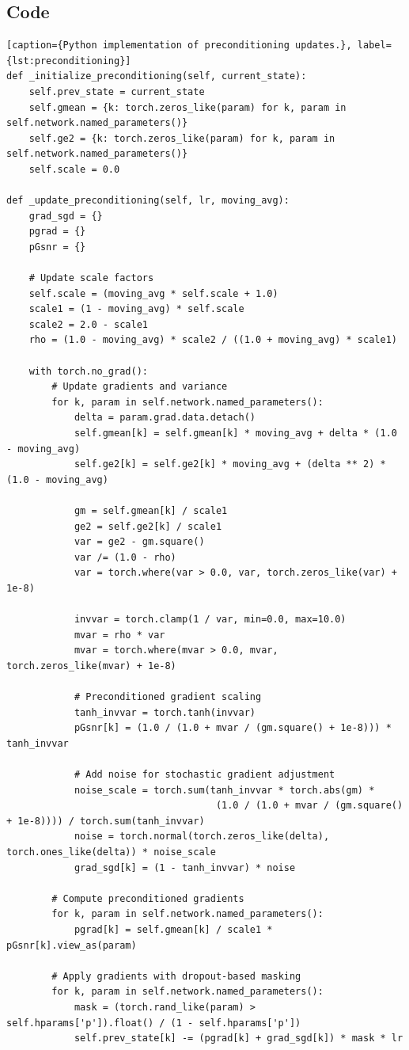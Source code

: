 \documentclass{article}
\theoremstyle{plain}
\theoremstyle{definition}
\theoremstyle{remark}
\begin{document}
\subsection{Code}
\begin{lstlisting}
[caption={Python implementation of preconditioning updates.}, label={lst:preconditioning}]
def _initialize_preconditioning(self, current_state):
    self.prev_state = current_state
    self.gmean = {k: torch.zeros_like(param) for k, param in self.network.named_parameters()}
    self.ge2 = {k: torch.zeros_like(param) for k, param in self.network.named_parameters()}
    self.scale = 0.0

def _update_preconditioning(self, lr, moving_avg):
    grad_sgd = {}
    pgrad = {}
    pGsnr = {}

    # Update scale factors
    self.scale = (moving_avg * self.scale + 1.0)
    scale1 = (1 - moving_avg) * self.scale
    scale2 = 2.0 - scale1
    rho = (1.0 - moving_avg) * scale2 / ((1.0 + moving_avg) * scale1)

    with torch.no_grad():
        # Update gradients and variance
        for k, param in self.network.named_parameters():
            delta = param.grad.data.detach()
            self.gmean[k] = self.gmean[k] * moving_avg + delta * (1.0 - moving_avg)
            self.ge2[k] = self.ge2[k] * moving_avg + (delta ** 2) * (1.0 - moving_avg)

            gm = self.gmean[k] / scale1
            ge2 = self.ge2[k] / scale1
            var = ge2 - gm.square()
            var /= (1.0 - rho)
            var = torch.where(var > 0.0, var, torch.zeros_like(var) + 1e-8)

            invvar = torch.clamp(1 / var, min=0.0, max=10.0)
            mvar = rho * var
            mvar = torch.where(mvar > 0.0, mvar, torch.zeros_like(mvar) + 1e-8)

            # Preconditioned gradient scaling
            tanh_invvar = torch.tanh(invvar)
            pGsnr[k] = (1.0 / (1.0 + mvar / (gm.square() + 1e-8))) * tanh_invvar

            # Add noise for stochastic gradient adjustment
            noise_scale = torch.sum(tanh_invvar * torch.abs(gm) * 
                                     (1.0 / (1.0 + mvar / (gm.square() + 1e-8)))) / torch.sum(tanh_invvar)
            noise = torch.normal(torch.zeros_like(delta), torch.ones_like(delta)) * noise_scale
            grad_sgd[k] = (1 - tanh_invvar) * noise

        # Compute preconditioned gradients
        for k, param in self.network.named_parameters():
            pgrad[k] = self.gmean[k] / scale1 * pGsnr[k].view_as(param)

        # Apply gradients with dropout-based masking
        for k, param in self.network.named_parameters():
            mask = (torch.rand_like(param) > self.hparams['p']).float() / (1 - self.hparams['p'])
            self.prev_state[k] -= (pgrad[k] + grad_sgd[k]) * mask * lr
\end{lstlisting}
\end{document}
